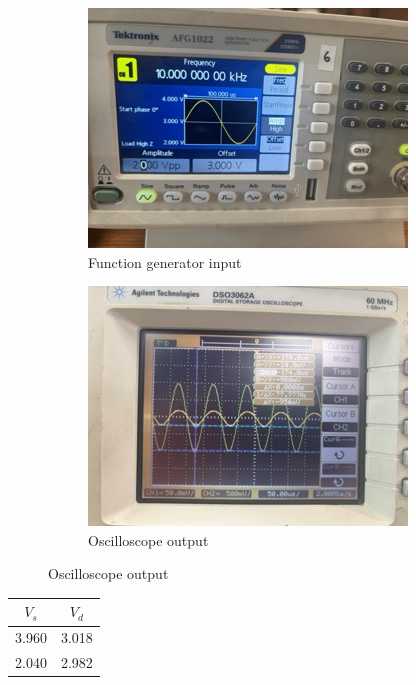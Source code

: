 \documentclass[12pt,a4paper]{article}
\begin{document}
\begin{figure}[ht!]
\centering
\begin{subfigure}[b]{0.47\linewidth}
    \centering
    \includegraphics[width=\textwidth]{Experiment_5/figs/rd_osc Small.jpeg}
    \caption{Function generator input}
\end{subfigure}
\begin{subfigure}[b]{0.48\linewidth}
    \centering
    \includegraphics[width=\textwidth]{Experiment_5/figs/rd Small.jpeg}
    \caption{Oscilloscope output}
\end{subfigure}
\end{figure}
\begin{table}[h!]
\centering
\begin{tabular}{|c|c|}
\hline
$V_s$ & $V_d$ \\
\hline
3.960 & 3.018 \\
2.040 & 2.982 \\
\hline
\end{tabular}
\end{table}
\end{document}
